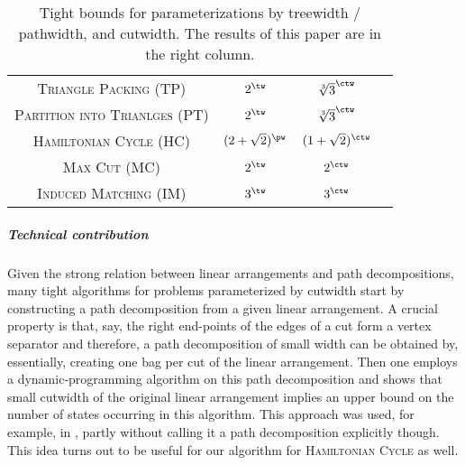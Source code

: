 \documentclass[a4paper,UKenglish,cleveref, autoref, thm-restate]{lipics-v2021}
\begin{document}
\begin{table}
\begin{center}
    \begin{tabular}{ |c|c|c|c| }
     \hline
     \textsc{Triangle Packing} (TP) & $2^{\tw}$ & $\sqrt[3]{3}^{\ctw}$\\
     \textsc{Partition into Trianlges} (PT) & $2^{\tw}$ & $\sqrt[3]{3}^{\ctw}$\\
     \textsc{Hamiltonian Cycle} (HC) & $(2+\sqrt{2})^{\pw}$ &$(1+\sqrt{2})^{\ctw}$\\
     \textsc{Max Cut} (MC) & $2^{\tw}$ &$2^{\ctw}$\\
     \textsc{Induced Matching} (IM) & $3^{\tw}$ & $3^{\ctw}$\\
     \hline
    \end{tabular}
    \end{center}
    \caption{Tight bounds for parameterizations by treewidth / pathwidth, and cutwidth. The results of this paper are in the right column. \label{table:results}}
\end{table}

\subparagraph{Technical contribution}
Given the strong relation between linear arrangements and path decompositions, many tight algorithms for problems parameterized by cutwidth start by constructing a path decomposition from a given linear arrangement. 
A crucial property is that, say, the right end-points of the edges of a cut form a vertex separator and therefore, a path decomposition of small width can be obtained by, essentially, creating one bag per cut of the linear arrangement.
Then one employs a dynamic-programming algorithm on this path decomposition and shows that small cutwidth of the original linear arrangement implies an upper bound on the number of states occurring in this algorithm. 
This approach was used, for example, in
\cite{DBLP:conf/stacs/BojikianCHK23, DBLP:conf/icalp/GroenlandMNPR24,DBLP:conf/stacs/GroenlandMNS22}, partly without calling it a path decomposition explicitly though.
This idea turns out to be useful for our algorithm for \textsc{Hamiltonian Cycle} as well.
\end{document}
